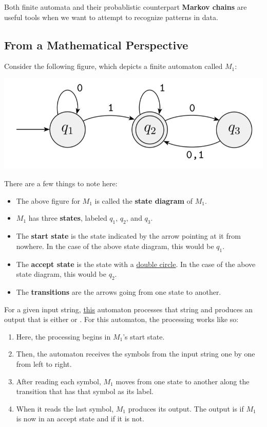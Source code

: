 \documentclass[letterpaper]{article}
\begin{document}
Both finite automata and their probablistic counterpart \textbf{Markov chains} are useful tools when we want to attempt to recognize patterns in data. 

\subsection{From a Mathematical Perspective}
Consider the following figure, which depicts a finite automaton called $M_1$:
\begin{center}
    \includegraphics[scale=0.4]{assets/finite_automaton_1.png}
\end{center}
There are a few things to note here: 
\begin{itemize}
    \item The above figure for $M_1$ is called the \textbf{state diagram} of $M_1$. 
    \item $M_1$ has three \textbf{states}, labeled $q_1$, $q_2$, and $q_3$. 
    \item The \textbf{start state} is the state indicated by the arrow pointing at it from nowhere. In the case of the above state diagram, this would be $q_1$. 
    \item The \textbf{accept state} is the state with a \underline{double circle}. In the case of the above state diagram, this would be $q_2$. 
    \item The \textbf{transitions} are the arrows going from one state to another. 
\end{itemize}
For a given input string, \underline{this} automaton processes that string and produces an output that is either  or . For this automaton, the processing works like so: 
\begin{enumerate}
    \item Here, the processing begins in $M_1$'s start state. 
    \item Then, the automaton receives the symbols from the input string one by one from left to right. 
    \item After reading each symbol, $M_1$ moves from one state to another along the transition that has that symbol as its label. 
    \item When it reads the last symbol, $M_1$ produces its output. The output is  if $M_1$ is now in an accept state and  if it is not. 
\end{enumerate}
\end{document}
